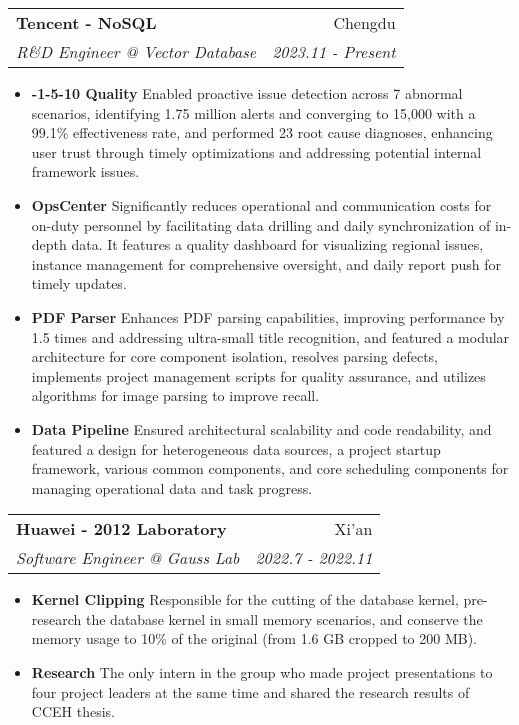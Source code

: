 \documentclass[letterpaper,10pt]{article}
\makeatletter
\newcommand{\resumeItem}[2]{
  \item\small{
    \textbf{\:#1}{ #2 \vspace{-4pt}}
  }
}
\newcommand{\resumeSubheading}[4]{
  \vspace{-1pt}\item
    \begin{tabular*}{0.97\textwidth}[t]{l@{\extracolsep{\fill}}r}
      \textbf{#1} & #2 \\
      \textit{\small#3} & \textit{\small #4} \\
    \end{tabular*}\vspace{-6pt}
}
\newcommand{\resumeItemListStart}{\begin{itemize}}
\newcommand{\resumeItemListEnd}{\end{itemize}\vspace{-5pt}}
\makeatother
\begin{document}
    \resumeSubheading
      {Tencent - NoSQL}{Chengdu}
      {R\&D Engineer @ Vector Database}{ 2023.11 - Present}
      \resumeItemListStart
      	\resumeItem{0-1-5-10 Quality}
		{Enabled proactive issue detection across 7 abnormal scenarios, identifying 1.75 million alerts and converging to 15,000 with a 99.1\% effectiveness rate, and performed 23 root cause diagnoses, enhancing user trust through timely optimizations and addressing potential internal framework issues.}
		\resumeItem{OpsCenter}
        {Significantly reduces operational and communication costs for on-duty personnel by facilitating data drilling and daily synchronization of in-depth data. It features a quality dashboard for visualizing regional issues, instance management for comprehensive oversight, and daily report push for timely updates.}
		\resumeItem{PDF Parser}
        {Enhances PDF parsing capabilities, improving performance by 1.5 times and addressing ultra-small title recognition, and featured a modular architecture for core component isolation, resolves parsing defects, implements project management scripts for quality assurance, and utilizes algorithms for image parsing to improve recall.}
		\resumeItem{Data Pipeline}
        {Ensured architectural scalability and code readability, and featured a design for heterogeneous data sources, a project startup framework, various common components, and core scheduling components for managing operational data and task progress.}
      \resumeItemListEnd

    \resumeSubheading
      {Huawei - 2012 Laboratory}{Xi'an}
      {Software Engineer @ Gauss Lab}{ 2022.7 - 2022.11}
      \resumeItemListStart
      	\resumeItem{Kernel Clipping}
		{Responsible for the cutting of the database kernel, pre-research the database kernel in small memory scenarios, and conserve the memory usage to 10\% of the original (from 1.6 GB cropped to 200 MB).}
		\resumeItem{Research}
        {The only intern in the group who made project presentations to four project leaders at the same time and shared the research results of CCEH thesis.}
      \resumeItemListEnd
          
    
\end{document}
